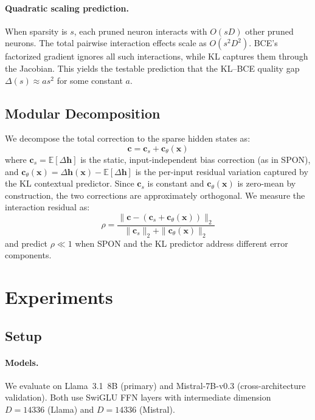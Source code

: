 \documentclass[11pt,a4paper]{article}
\begin{document}
\paragraph{Quadratic scaling prediction.}
When sparsity is $s$, each pruned neuron interacts with $O(sD)$ other pruned neurons.
The total pairwise interaction effects scale as $O(s^2 D^2)$.
BCE's factorized gradient ignores all such interactions, while KL captures them through the Jacobian.
This yields the testable prediction that the KL--BCE quality gap $\Delta(s) \approx a s^2$ for some constant $a$.

\subsection{Modular Decomposition}
\label{sec:decomposition}

We decompose the total correction to the sparse hidden states as:
\begin{equation}
\mathbf{c} = \mathbf{c}_s + \mathbf{c}_\theta(\mathbf{x})
\end{equation}
where $\mathbf{c}_s = \mathbb{E}[\Delta\mathbf{h}]$ is the static, input-independent bias correction (as in SPON), and $\mathbf{c}_\theta(\mathbf{x}) = \Delta\mathbf{h}(\mathbf{x}) - \mathbb{E}[\Delta\mathbf{h}]$ is the per-input residual variation captured by the KL contextual predictor.
Since $\mathbf{c}_s$ is constant and $\mathbf{c}_\theta(\mathbf{x})$ is zero-mean by construction, the two corrections are approximately orthogonal.
We measure the interaction residual as:
\begin{equation}
\rho = \frac{\|\mathbf{c} - (\mathbf{c}_s + \mathbf{c}_\theta(\mathbf{x}))\|_2}{\|\mathbf{c}_s\|_2 + \|\mathbf{c}_\theta(\mathbf{x})\|_2}
\end{equation}
and predict $\rho \ll 1$ when SPON and the KL predictor address different error components.

\section{Experiments}
\label{sec:experiments}

\subsection{Setup}

\paragraph{Models.}
We evaluate on Llama~3.1~8B (primary) and Mistral-7B-v0.3 (cross-architecture validation).
Both use SwiGLU FFN layers with intermediate dimension $D = 14336$ (Llama) and $D = 14336$ (Mistral).
\end{document}
